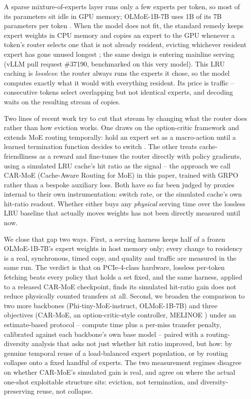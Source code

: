 \documentclass{article}
\begin{document}
A sparse mixture-of-experts layer runs only a few experts per token, so most of its
parameters sit idle in GPU memory; OLMoE-1B-7B uses 1B of its 7B parameters per token
\citep{muennighoff2024olmoe}. When the model does not fit, the standard remedy keeps expert
weights in CPU memory and copies an expert to the GPU whenever a token's router selects one
that is not already resident, evicting whichever resident expert has gone unused longest
\citep{eliseev2023offloading}; the same design is entering mainline serving (vLLM pull
request \#37190, benchmarked on this very model). This LRU caching is \emph{lossless}: the
router always runs the experts it chose, so the model computes exactly what it would with
everything resident. Its price is traffic -- consecutive tokens select overlapping but not
identical experts, and decoding waits on the resulting stream of copies.

Two lines of recent work try to cut that stream by changing what the router does rather than
how eviction works. One draws on the option-critic framework \citep{bacon2017optioncritic}
and extends MoE routing temporally: hold an expert set as a macro-action until a learned
termination function decides to switch \citep{shen2026temporal}. The other treats
cache-friendliness as a reward and fine-tunes the router directly with policy gradients,
using a simulated LRU cache's hit ratio as the signal -- the approach we call CAR-MoE
(Cache-Aware Routing for MoE) in this paper, trained with GRPO
\citep{shao2024deepseekmath,yu2025dapo} rather than a bespoke auxiliary loss. Both have so
far been judged by proxies internal to their own instrumentation: switch rate, or the
simulated cache's own hit-ratio readout. Whether either buys any \emph{physical} serving
time over the lossless LRU baseline that actually moves weights has not been directly
measured until now.

We close that gap two ways. First, a serving harness keeps half of a frozen OLMoE-1B-7B's
expert weights in host memory only; every change to residency is a real, synchronous,
timed copy, and quality and traffic are measured in the same run. The verdict is that on
PCIe-4-class hardware, lossless per-token fetching beats every policy that holds a set
fixed, and the same harness, applied to a released CAR-MoE checkpoint, finds its simulated
hit-ratio gain does not reduce physically counted transfers at all. Second, we broaden the
comparison to two more backbones (Phi-tiny-MoE-instruct, OLMoE-1B-7B) and three objectives
(CAR-MoE, an option-critic-style controller, MELINOE \citep{raje2026melinoe}) under an
estimate-based protocol -- compute time plus a per-miss transfer penalty, calibrated against
each backbone's own base model -- paired with a routing-diversity analysis that asks not just
whether hit ratio improved, but how: by genuine temporal reuse of a load-balanced expert
population, or by routing collapse onto a fixed handful of experts. The two measurement
regimes disagree on whether CAR-MoE's simulated gain is real, and agree on where the actual
one-shot exploitable structure sits: eviction, not termination, and diversity-preserving
reuse, not collapse.
\end{document}
